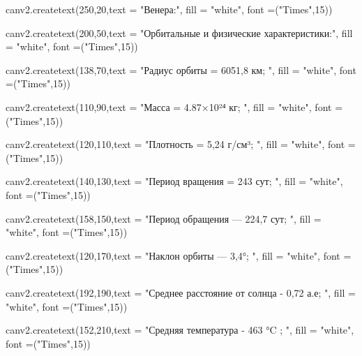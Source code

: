 \documentclass[14pt, oneside]{SavkinSeliverstov}
\begin{document}
	canv\underline{\hspace{0.2cm}}2.create\underline{\hspace{0.2cm}}text(250,20,text = "Венера:", fill = "white", font =("Times",15))
	
	canv\underline{\hspace{0.2cm}}2.create\underline{\hspace{0.2cm}}text(200,50,text = "Орбитальные и физические характеристики:", fill = "white", font =("Times",15))

	canv\underline{\hspace{0.2cm}}2.create\underline{\hspace{0.2cm}}text(138,70,text = "Радиус орбиты = 6051,8 км; ", fill = "white", font =("Times",15))
	
	canv\underline{\hspace{0.2cm}}2.create\underline{\hspace{0.2cm}}text(110,90,text = "Масса = 4.87×10²⁴ кг; ", fill = "white", font =("Times",15))

	canv\underline{\hspace{0.2cm}}2.create\underline{\hspace{0.2cm}}text(120,110,text = "Плотность = 5,24 г/см³; ", fill = "white", font =("Times",15))

	canv\underline{\hspace{0.2cm}}2.create\underline{\hspace{0.2cm}}text(140,130,text = "Период вращения = 243 сут; ", fill = "white", font =("Times",15))

	canv\underline{\hspace{0.2cm}}2.create\underline{\hspace{0.2cm}}text(158,150,text = "Период обращения — 224,7 сут; ", fill = "white", font =("Times",15))

	canv\underline{\hspace{0.2cm}}2.create\underline{\hspace{0.2cm}}text(120,170,text = "Наклон орбиты — 3,4°; ", fill = "white", font =("Times",15))

	canv\underline{\hspace{0.2cm}}2.create\underline{\hspace{0.2cm}}text(192,190,text = "Среднее расстояние от солнца - 0,72 а.е; ", fill = "white", font =("Times",15))
	
	canv\underline{\hspace{0.2cm}}2.create\underline{\hspace{0.2cm}}text(152,210,text = "Средняя температура - 463 °C ; ", fill = "white", font =("Times",15))
	
\end{document}
